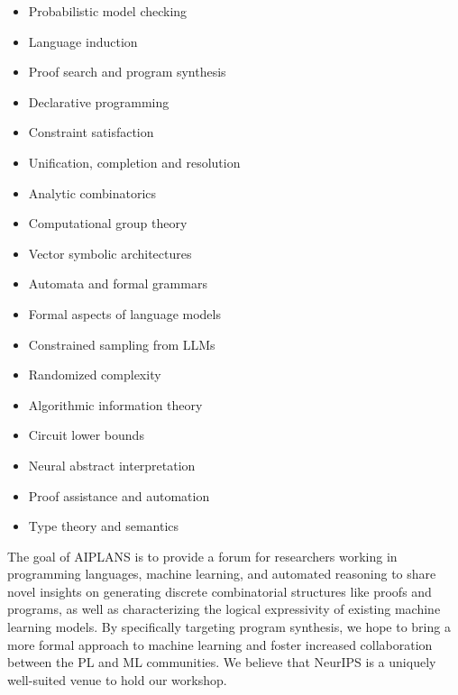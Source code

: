 \documentclass{article}
\begin{document}
\begin{multicols}{2}
  \begin{itemize}
    \item Probabilistic model checking~\cite{kwiatkowska2018probabilistic}
    \item Language induction
    \item Proof search and program synthesis
    \item Declarative programming~\cite{kordjamshidi2022declarative}
    \item Constraint satisfaction
    \item Unification, completion and resolution
    \item Analytic combinatorics~\cite{flajolet2009analytic}
    \item Computational group theory
    \item Vector symbolic architectures~\cite{hersche2023neuro}
    \item Automata and formal grammars
    \item Formal aspects of language models~\cite{cotterell2023formal}
    \item Constrained sampling from LLMs
    \item Randomized complexity
    \item Algorithmic information theory~\cite{chaitin1977algorithmic}
    \item Circuit lower bounds~\cite{merrill2022saturated}
    \item Neural abstract interpretation~\cite{muller2023abstract}
    \item Proof assistance and automation
    \item Type theory and semantics
  \end{itemize}
\end{multicols}

The goal of AIPLANS is to provide a forum for researchers working in programming languages, machine learning, and automated reasoning to share novel insights on generating discrete combinatorial structures like proofs and programs, as well as characterizing the logical expressivity of existing machine learning models. By specifically targeting program synthesis, we hope to bring a more formal approach to machine learning and foster increased collaboration between the PL and ML communities. We believe that NeurIPS is a uniquely well-suited venue to hold our workshop.
\end{document}
